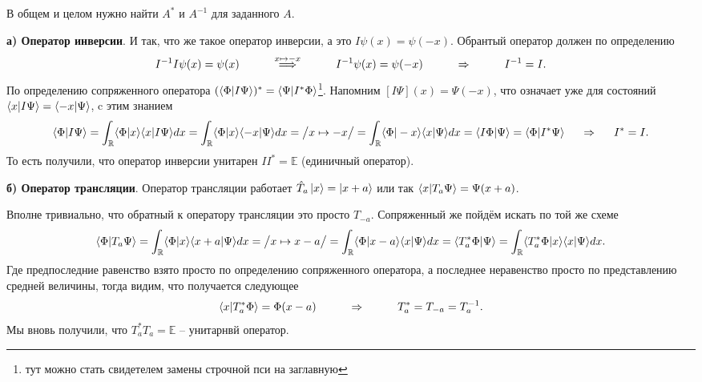 В общем и целом нужно найти $A^*$ и $A^{-1}$ для заданного $A$. 


\textbf{а) Оператор инверсии}. И так, что же такое оператор инверсии, а это $I \psi(x) = \psi(-x)$.
Обрантый оператор должен по определению
\begin{equation*}
	I^{-1} I \psi(x) = \psi(x)
	\hspace{1 cm}
	\overset{x \mapsto -x}{\Longrightarrow}
	\hspace{1 cm}
	I^{-1} \psi(x) = \psi(-x)
	\hspace{1 cm}
	\Rightarrow
	\hspace{1 cm}
	I^{-1} = I.
\end{equation*}
По определению сопряженного оператора $(\bk{\Phi}{I \Psi})^* = \bk{\Psi}{I^* \Phi}$\footnote{тут можно стать свидетелем замены строчной пси на заглавную}.
Напомним
$[I\Psi](x) = \Psi(-x)$, что означает уже для состояний $\bk{x}{I \Psi} = \bk{- x}{\Psi}$, c этим знанием
\begin{equation*}
	\bk{\Phi}{I \Psi} = \int_{\mathbb{R}} \bk{\Phi}{x} \bk{x}{I \Psi} d x
	=
	\int_{\mathbb{R}} \bk{\Phi}{x}\bk{-x}{\Psi} d x =\big/ x \mapsto - x \big/ =  \int_{\mathbb{R}} \bk{\Phi}{- x}\bk{x}{\Psi} d x
	=
	\bk{I \Phi}{\Psi} = \bk{\Phi}{I^* \Psi}
	\hspace{0.5 cm}
	\Rightarrow
	\hspace{0.5 cm}
	I^{*} = I.
\end{equation*}
То есть получили, что оператор инверсии унитарен $I I^* = \mathbb{E}$ (единичный оператор).

\textbf{б) Оператор трансляции}.
Оператор трансляции работает $\hat{T}_a \left| x \right\rangle = \left| x+a \right\rangle$ или так $\bk{x}{T_a\Psi} = \Psi(x + a)$.

Вполне тривиально, что обратный к оператору трансляции это просто $T_{-a}$. Сопряженный же пойдём искать по той же схеме
\begin{equation*}
	\bk{\Phi}{T_a \Psi} = \int_{\mathbb{R}} \bk{\Phi}{x} \bk{x+a}{\Psi} d x 
	= 
	\big/ x \mapsto x - a\big/
	=
	\int_{\mathbb{R}} \bk{\Phi}{x-a} \bk{x}{\Psi} d x 
	=
	\bk{T_a^{*}\Phi}{\Psi}
	=
	\int_{\mathbb{R}} \bk{T_a^{*}\Phi}{x} \bk{x}{\Psi} d x. 
\end{equation*}
Где предпоследние равенство взято просто по определению сопряженного оператора, а последнее неравенство просто по представлению средней величины, тогда видим, что получается следующее
\begin{equation*}
	\bk{x}{T_a^* \Phi} = \Phi(x-a)
	\hspace{1 cm}
	\Rightarrow
	\hspace{1 cm}
	T_a^* = T_{-a} = T_a^{-1}.
\end{equation*}
Мы вновь получили, что $T_a^* T_a = \mathbb{E}$ -- унитарнвй оператор.